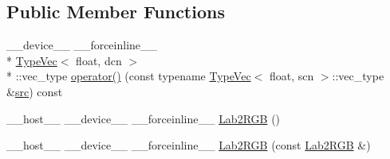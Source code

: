 \subsection*{Public Member Functions}
\begin{DoxyCompactItemize}
\item 
\-\_\-\-\_\-device\-\_\-\-\_\- \-\_\-\-\_\-forceinline\-\_\-\-\_\- \\*
\hyperlink{structcv_1_1gpu_1_1device_1_1TypeVec}{Type\-Vec}$<$ float, dcn $>$\\*
\-::vec\-\_\-type \hyperlink{structcv_1_1gpu_1_1device_1_1color__detail_1_1Lab2RGB_3_01float_00_01scn_00_01dcn_00_01srgb_00_01blueIdx_01_4_a89a81d00caf31fc52c9f61991f92c34a}{operator()} (const typename \hyperlink{structcv_1_1gpu_1_1device_1_1TypeVec}{Type\-Vec}$<$ float, scn $>$\-::vec\-\_\-type \&\hyperlink{legacy_8hpp_a371cd109b74033bc4366f584edd3dacc}{src}) const 
\item 
\-\_\-\-\_\-host\-\_\-\-\_\- \-\_\-\-\_\-device\-\_\-\-\_\- \-\_\-\-\_\-forceinline\-\_\-\-\_\- \hyperlink{structcv_1_1gpu_1_1device_1_1color__detail_1_1Lab2RGB_3_01float_00_01scn_00_01dcn_00_01srgb_00_01blueIdx_01_4_a313350009168814e4433c73d52e94a77}{Lab2\-R\-G\-B} ()
\item 
\-\_\-\-\_\-host\-\_\-\-\_\- \-\_\-\-\_\-device\-\_\-\-\_\- \-\_\-\-\_\-forceinline\-\_\-\-\_\- \hyperlink{structcv_1_1gpu_1_1device_1_1color__detail_1_1Lab2RGB_3_01float_00_01scn_00_01dcn_00_01srgb_00_01blueIdx_01_4_a1179ce11f343e742fd9dd21f567a237a}{Lab2\-R\-G\-B} (const \hyperlink{structcv_1_1gpu_1_1device_1_1color__detail_1_1Lab2RGB}{Lab2\-R\-G\-B} \&)
\end{DoxyCompactItemize}


